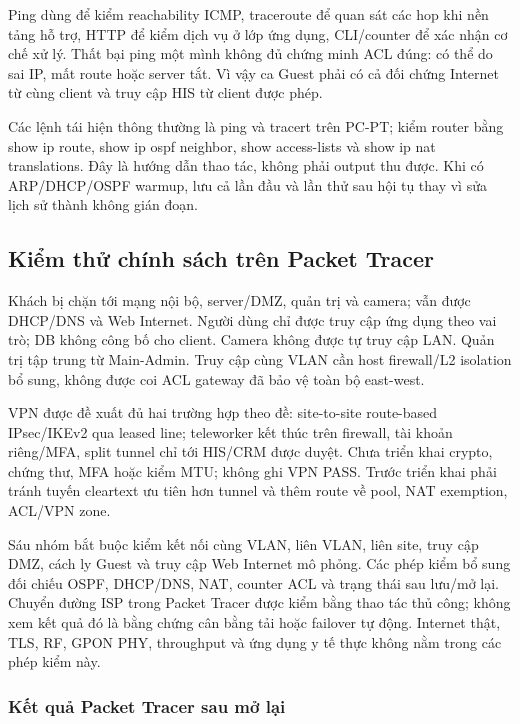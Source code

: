 Ping dùng để kiểm reachability ICMP, traceroute để quan sát các hop khi
nền tảng hỗ trợ, HTTP để kiểm dịch vụ ở lớp ứng dụng, CLI/counter để xác
nhận cơ chế xử lý. Thất bại ping một mình không đủ chứng minh ACL đúng:
có thể do sai IP, mất route hoặc server tắt. Vì vậy ca Guest phải có cả
đối chứng Internet từ cùng client và truy cập HIS từ client được phép.

Các lệnh tái hiện thông thường là ping và tracert trên PC-PT;
kiểm router bằng show ip route, show ip ospf
neighbor, show access-lists và show ip nat translations. Đây là hướng
dẫn thao tác, không phải output thu được. Khi có ARP/DHCP/OSPF warmup,
lưu cả lần đầu và lần thử sau hội tụ thay vì sửa lịch sử thành không
gián đoạn.

\FloatBarrier
\subsection{Kiểm thử chính sách trên Packet Tracer}\label{kiux1ec3m-thux1eed-chuxednh-suxe1ch-vuxe0-kux1ebft-quux1ea3-theo-nux1ec1n-tux1ea3ng}

Khách bị chặn tới mạng nội bộ, server/DMZ, quản trị và camera; vẫn được
DHCP/DNS và Web Internet. Người dùng chỉ được truy cập ứng dụng theo vai
trò; DB không công bố cho client. Camera không được tự truy cập LAN.
Quản trị tập trung từ Main-Admin. Truy cập cùng VLAN cần host
firewall/L2 isolation bổ sung, không được coi ACL gateway đã bảo vệ toàn
bộ east-west.

VPN được đề xuất đủ hai trường hợp theo đề: site-to-site route-based
IPsec/IKEv2 qua leased line; teleworker kết thúc trên firewall, tài
khoản riêng/MFA, split tunnel chỉ tới HIS/CRM được duyệt. Chưa triển
khai crypto, chứng thư, MFA hoặc kiểm MTU; không ghi VPN PASS. Trước
triển khai phải tránh tuyến cleartext ưu tiên hơn tunnel và thêm route
về pool, NAT exemption, ACL/VPN zone.

Sáu nhóm bắt buộc kiểm kết nối cùng VLAN, liên VLAN, liên site, truy cập
DMZ, cách ly Guest và truy cập Web Internet mô phỏng. Các phép kiểm bổ sung
đối chiếu OSPF, DHCP/DNS, NAT, counter ACL và trạng thái sau lưu/mở lại.
Chuyển đường ISP trong Packet Tracer được kiểm bằng thao tác thủ công;
không xem kết quả đó là bằng chứng cân bằng tải hoặc failover tự động.
Internet thật, TLS, RF, GPON PHY, throughput và ứng dụng y tế thực không
nằm trong các phép kiểm này.

\subsubsection{Kết quả Packet Tracer sau mở
lại}\label{kux1ebft-quux1ea3-packet-tracer-sau-mux1edf-lux1ea1i}

